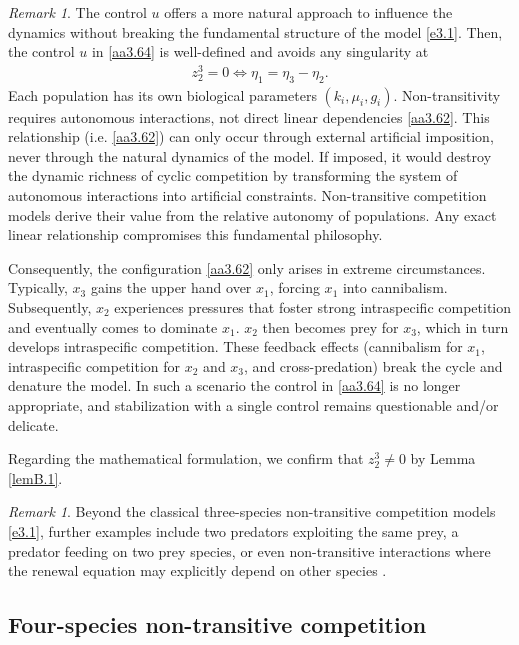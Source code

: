 \documentclass[10pt, a4paper]{amsart}
\theoremstyle{plain}
\theoremstyle{definition}
\theoremstyle{remark}
\newtheorem{remark}[lemma]{Remark}
\numberwithin{equation}{section}
\begin{document}
\begin{remark}\label{rem3.8}
The control $u$ offers a more natural approach to influence the dynamics without breaking the fundamental structure of the model  \eqref{e3.1}. Then, the control $u$ in \eqref{aa3.64} is well-defined and avoids any singularity at 
\begin{align}\label{aa3.62}
    z^3_2=0\Longleftrightarrow \eta_1=\eta_3-\eta_2.
\end{align}
Each population has its own biological parameters $(k_i, \mu_i, g_i)$. Non-transitivity requires autonomous interactions, not direct linear dependencies \eqref{aa3.62}. This relationship (i.e. \eqref{aa3.62}) can only occur through external artificial imposition, never through the natural dynamics of the model. If imposed, it would destroy the dynamic richness of cyclic competition by transforming the system of autonomous interactions into artificial constraints. Non-transitive competition models derive their value from the relative autonomy of populations. Any exact linear relationship compromises this fundamental philosophy.  

Consequently, the configuration \eqref{aa3.62} only arises in extreme circumstances. Typically, $x_3$ gains the upper hand over $x_1$, forcing $x_1$ into cannibalism. Subsequently, $x_2$ experiences pressures that foster strong intraspecific competition and eventually comes to dominate $x_1$. $x_2$ then becomes prey for $x_3$, which in turn develops intraspecific competition. These feedback effects  (cannibalism for $x_1$, intraspecific competition for $x_2$ and $x_3$, and cross-predation)  break the cycle and denature the model. In such a scenario the control in \eqref{aa3.64} is no longer appropriate, and stabilization with a single control remains questionable and/or delicate.

Regarding the mathematical formulation, we confirm that \(z^3_2\neq 0\) by Lemma \ref{lemB.1}.%
\end{remark}

\begin{remark}
Beyond the classical three-species non-transitive competition models \eqref{e3.1}, further examples include two predators exploiting the same prey, a predator feeding on two prey species, or even non-transitive interactions where the renewal equation may explicitly depend on other species \cite{ref3}.
\end{remark}
\subsection{\bf Four-species non-transitive competition}
\end{document}
